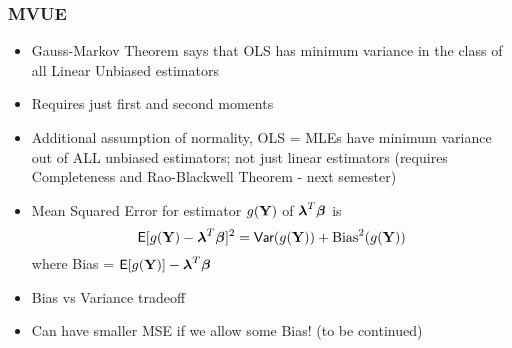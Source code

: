 \documentclass[handout]{beamer}
\begin{document}
\begin{frame}
  \frametitle{MVUE}
  \begin{itemize}
  \item Gauss-Markov Theorem says that OLS has minimum variance in the
    class of all Linear Unbiased estimators \pause
\item Requires just first and second moments \pause
\item Additional assumption of normality,  OLS = MLEs have
  minimum variance out of \alert<3>{ALL}  unbiased estimators; not
  just linear estimators \pause (requires Completeness and
Rao-Blackwell Theorem - next semester) \pause
\item Mean Squared Error for estimator $g(\mathbf{Y})$ of $\boldsymbol{\lambda}^T\boldsymbol{\beta}$ is
$$\textsf{E}[g(\mathbf{Y}) - \boldsymbol{\lambda}^T\boldsymbol{\beta}]^2 = \textsf{Var}(g(\mathbf{Y})) + \text{Bias}^2(g(\mathbf{Y}))$$
where Bias = $\textsf{E}[g(\mathbf{Y})] - \boldsymbol{\lambda}^T\boldsymbol{\beta}$  \pause
\item Bias vs Variance tradeoff \pause
\item Can have smaller MSE if we allow some Bias!  (to be continued)
  \end{itemize}

\end{frame}
\end{document}
